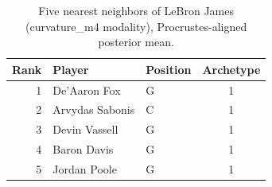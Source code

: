 \begin{table}[htbp]
  \centering\small
  \begin{tabular}{rllc}
    \toprule
    Rank & Player & Position & Archetype \\
    \midrule
    1 & De'Aaron Fox & G & 1 \\
    2 & Arvydas Sabonis & C & 1 \\
    3 & Devin Vassell & G & 1 \\
    4 & Baron Davis & G & 1 \\
    5 & Jordan Poole & G & 1 \\
    \bottomrule
  \end{tabular}
  \caption{Five nearest neighbors of LeBron James (curvature_m4 modality), Procrustes-aligned posterior mean.}
  \label{tab:LeBron_James_neighbors_curvature_m4}
\end{table}

